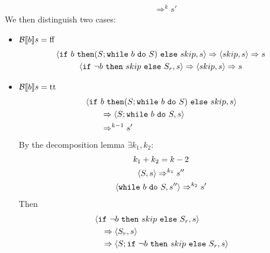 \begin{exercise}
\begin{itemize}
\begin{itemize}
\begin{align*}
                    \\&\qquad\Rightarrow^k s'
                \end{align*}
                We then distinguish two cases:
                \begin{itemize}
                    \item $\mathcal{B} \llbracket  b \rrbracket s = \text{ff}$
                    \begin{gather*}
                        \instr{\texttt{if}\ b\ \texttt{then} (S; \texttt{while}\ b\ \texttt{do}\ S)\ \texttt{else}\ skip}{s}
                        \Rightarrow
                        \instr{skip}{s}
                        \Rightarrow s
                        \\
                        \instr{\texttt{if}\ \neg b\ \texttt{then}\ skip\ \texttt{else}\ S_r}{s}
                        \Rightarrow
                        \instr{skip}{s}
                        \Rightarrow s
                    \end{gather*}
                    \item $\mathcal{B} \llbracket  b \rrbracket s = \text{tt}$
                        \begin{align*}
                            &\left<\texttt{if}\ b\ \texttt{then} (S; \texttt{while}\ b\ \texttt{do}\ S)\ \texttt{else}\ skip, s\right>
                            \\&\qquad\Rightarrow \left<S; \texttt{while}\ b\ \texttt{do}\ S, s\right>
                            \\&\qquad\Rightarrow^{k-1} s'
                        \end{align*}
                        By the decomposition lemma $\exists k_1, k_2 :$
                        \begin{gather*}
                            k_1 + k_2 = k - 2 \\
                            \instr{S}{s} \Rightarrow^{k_1} s'' \\
                            \instr{\texttt{while}\ b\ \texttt{do}\ S}{s''} \Rightarrow^{k_2} s'
                        \end{gather*}
                        Then
                        \begin{align*}
                            &\instr{\texttt{if}\ \neg b\ \texttt{then}\ skip\ \texttt{else}\ S_r}{s}
                            \\&\quad\Rightarrow \instr{S_r}{s}
                            \\&\quad\Rightarrow \instr{S; \texttt{if}\ \neg b\ \texttt{then}\ skip\ \texttt{else}\ S_r}{s}

\end{align*}
\end{itemize}
\end{itemize}
\end{itemize}
\end{exercise}
